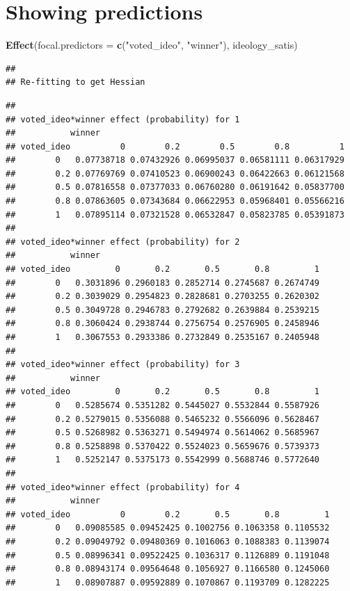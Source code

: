 \documentclass[]{book}
\newenvironment{Shaded}{\begin{snugshade}}{\end{snugshade}}
\newcommand{\KeywordTok}[1]{\textcolor[rgb]{0.13,0.29,0.53}{\textbf{#1}}}
\newcommand{\DataTypeTok}[1]{\textcolor[rgb]{0.13,0.29,0.53}{#1}}
\newcommand{\StringTok}[1]{\textcolor[rgb]{0.31,0.60,0.02}{#1}}
\newcommand{\NormalTok}[1]{#1}
\begin{document}
\chapter{Showing predictions}\label{showing-predictions}

\begin{Shaded}
\begin{Highlighting}[]
\KeywordTok{Effect}\NormalTok{(}\DataTypeTok{focal.predictors =} \KeywordTok{c}\NormalTok{(}\StringTok{"voted_ideo"}\NormalTok{, }\StringTok{"winner"}\NormalTok{), ideology_satis)}
\end{Highlighting}
\end{Shaded}

\begin{verbatim}
## 
## Re-fitting to get Hessian
\end{verbatim}

\begin{verbatim}
## 
## voted_ideo*winner effect (probability) for 1
##           winner
## voted_ideo          0        0.2        0.5        0.8          1
##        0   0.07738718 0.07432926 0.06995037 0.06581111 0.06317929
##        0.2 0.07769769 0.07410523 0.06900243 0.06422663 0.06121568
##        0.5 0.07816558 0.07377033 0.06760280 0.06191642 0.05837700
##        0.8 0.07863605 0.07343684 0.06622953 0.05968401 0.05566216
##        1   0.07895114 0.07321528 0.06532847 0.05823785 0.05391873
## 
## voted_ideo*winner effect (probability) for 2
##           winner
## voted_ideo         0       0.2       0.5       0.8         1
##        0   0.3031896 0.2960183 0.2852714 0.2745687 0.2674749
##        0.2 0.3039029 0.2954823 0.2828681 0.2703255 0.2620302
##        0.5 0.3049728 0.2946783 0.2792682 0.2639884 0.2539215
##        0.8 0.3060424 0.2938744 0.2756754 0.2576905 0.2458946
##        1   0.3067553 0.2933386 0.2732849 0.2535167 0.2405948
## 
## voted_ideo*winner effect (probability) for 3
##           winner
## voted_ideo         0       0.2       0.5       0.8         1
##        0   0.5285674 0.5351282 0.5445027 0.5532844 0.5587926
##        0.2 0.5279015 0.5356088 0.5465232 0.5566096 0.5628467
##        0.5 0.5268982 0.5363271 0.5494974 0.5614062 0.5685967
##        0.8 0.5258898 0.5370422 0.5524023 0.5659676 0.5739373
##        1   0.5252147 0.5375173 0.5542999 0.5688746 0.5772640
## 
## voted_ideo*winner effect (probability) for 4
##           winner
## voted_ideo          0        0.2       0.5       0.8         1
##        0   0.09085585 0.09452425 0.1002756 0.1063358 0.1105532
##        0.2 0.09049792 0.09480369 0.1016063 0.1088383 0.1139074
##        0.5 0.08996341 0.09522425 0.1036317 0.1126889 0.1191048
##        0.8 0.08943174 0.09564648 0.1056927 0.1166580 0.1245060
##        1   0.08907887 0.09592889 0.1070867 0.1193709 0.1282225
\end{verbatim}
\end{document}
